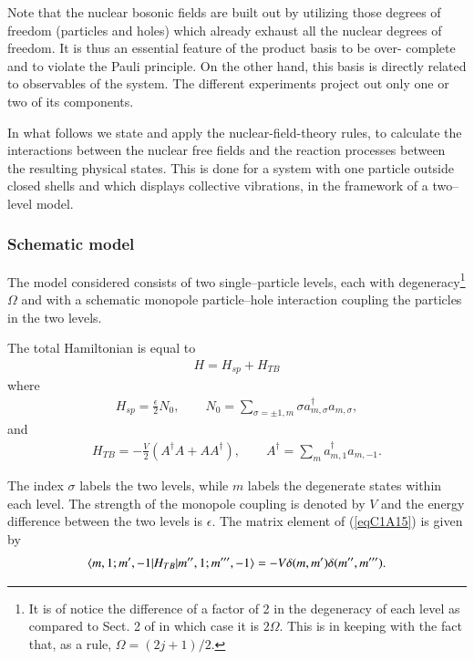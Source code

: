 Note that the nuclear bosonic fields are built out by utilizing those degrees
of freedom (particles and holes) which already exhaust all the nuclear degrees
of freedom. It is thus an essential feature of the product basis to be over-
complete and to violate the Pauli principle. On the other hand, this basis is
directly related to observables of the system. The different experiments project out only one or two of its components.


In what follows we state and apply the nuclear-field-theory rules, to calculate the interactions between the nuclear free fields and the reaction processes
between the resulting physical states. This is done for a system with one particle outside closed shells and which displays collective vibrations, in the framework of a two--level model.
\subsubsection{Schematic model}
The model considered consists of two single--particle levels, each with degeneracy\footnote{It is of notice the difference of a factor of 2 in the degeneracy of each level as compared to Sect. 2 of \cite{Bortignon:77} in which case it is $2\Omega$. This is in keeping with the fact that, as a rule, $\Omega=(2j+1)/2$.} $\Omega$ and with a schematic monopole particle--hole interaction coupling the particles in the two levels.

The total Hamiltonian is equal to
\begin{align}\label{eqC1A13} 
H=H_{sp}+H_{TB}
\end{align}
where
\begin{align}\label{eqC1A14} 
H_{sp}=\frac{\epsilon}{2}N_0,\quad\quad N_0=\sum_{\sigma=\pm 1,m}\sigma a^{\dagger}_{m,\sigma}a_{m,\sigma},
\end{align}
and
\begin{align}\label{eqC1A15} 
H_{TB}=-\frac{V}{2}\left(A^\dagger A+AA^\dagger\right),\quad\quad A^\dagger=\sum_m a^\dagger_{m,1}a_{m,-1}.
\end{align}


The index $\sigma$ labels the two levels, while $m$ labels the degenerate states within
each level. The strength of the monopole coupling is denoted by $V$ and the
energy difference between the two levels is $\epsilon$. 
The matrix element of (\ref{eqC1A15}) is given by
\begin{align}\label{eqC1A16} 
\langle {m,1;m',-1|H_{TB}|m'',1;m''',-1} \rangle=-V\delta(m,m')\delta(m'',m''').
\end{align}
